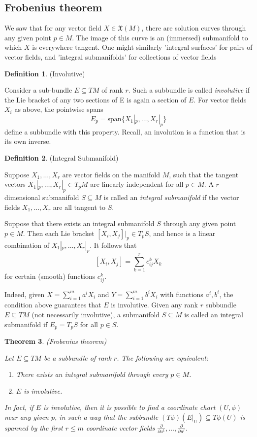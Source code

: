\documentclass{article}
\newtheorem{theorem}{Theorem}[section]
\theoremstyle{definition}
\newtheorem{defn}[theorem]{Definition}
\newenvironment{definition}
  {\vspace{8pt}\begin{mdframed}[backgroundcolor=blueish,innertopmargin=4]\begin{defn}}
  {\end{defn}\end{mdframed}\vspace{4pt}}
\begin{document}
\subsection{Frobenius theorem}
We saw that for any vector field $X \in \mathfrak X(M)$, there are solution curves through any given point $p \in M$. The image of this curve is an (immersed) submanifold to which $X$ is everywhere tangent. One might similarly 'integral surfaces' for pairs of vector fields, and 'integral submanifolds' for collections of vector fields

\begin{definition} (Involutive)

Consider a sub-bundle $E \subseteq TM$ of rank $r$. Such a subbundle is called \textit{involutive} if the Lie bracket of any two sections of E is again a section of $E$. For vector fields $X_i$ as above, the pointwise spans 
\[
    E_p = \text{span} \{X_1|_p,\dots,X_r |_p\}
\]
define a subbundle with this property. Recall, an involution is a function that is its own inverse.
\end{definition}


\begin{definition} (Integral Submanifold)

Suppose $X_1,\dots,X_r$ are vector fields on the manifold $M$, such that the tangent vectors $X_1|_p,\dots,X_r |_p \in T_pM$ are linearly independent for all $p \in M$. A $r$-dimensional submanifold $S \subseteq M$ is called an \textit{integral submanifold} if the vector fields $X_1,\dots,X_r$ are all tangent to $S$.

Suppose that there exists an integral submanifold $S$ through any given point $p \in M$. Then each Lie bracket $[X_i ,X_j ] |_p \in T_pS$, and hence is a linear combination of $X_1|_p,\dots,X_r |_p.$ It follows that 
\[ 
    [X_i ,X_j ] = \sum_{k=1}^r c^k_{ij}X_k
\]
for certain (smooth) functions $c^k_{i j}$.

Indeed, given $X = \sum_{i=1}^m a^i X_i$ and $Y = \sum^m_{i=1} b^i X_i$ with functions $a^i ,b^i$, the condition above guarantees that $E$ is involutive. Given any rank $r$ subbundle $E \subseteq TM$ (not necessarily involutive), a submanifold $S \subseteq M$ is
called an integral submanifold if $E_p = T_pS$ for all $p \in S$.
\end{definition}


\begin{theorem} (Frobenius theorem)

Let $E \subseteq TM$ be a subbundle of rank $r$. The following are equivalent: 
\begin{enumerate}
    \item There exists an integral submanifold through every $p \in M$.
    \item $E$ is involutive. 
\end{enumerate}

In fact, if $E$ is involutive, then it is possible to find a coordinate chart $(U,\phi)$ near any given $p$, in such a way that the subbundle $(T\phi)(E|_U ) \subseteq T\phi(U)$ is spanned by the first $r \leq m$ coordinate vector fields $\frac{\partial}{\partial u^1},\dots, \frac{\partial}{\partial u^r}$.

\end{theorem}
\end{document}
